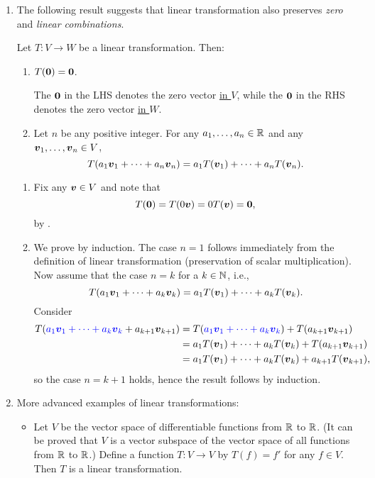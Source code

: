 \begin{enumerate}
\item The following result suggests that linear transformation also preserves
\emph{zero} and \emph{linear combinations}.
\begin{proposition}
\label{prp:lt-zero-to-zero-preserv-lincomb}
Let \(T:V\to W\) be a linear transformation. Then:
\begin{enumerate}
\item \(T(\vb*{0})=\vb*{0}\).
\begin{note}
The \(\vb*{0}\) in the LHS denotes the zero vector \underline{in \(V\)}, while
the \(\vb*{0}\) in the RHS denotes the zero vector \underline{in \(W\)}.
\end{note}
\item Let \(n\) be any positive integer. For any \(a_1,\dotsc,a_n\in\mathbb{R}\) and
any \(\vb*{v}_1,\dotsc,\vb*{v}_n\in V\),
\[
T(a_1\vb*{v}_1+\dotsb+a_n\vb*{v}_n)=a_1T(\vb*{v}_1)+\dotsb+a_nT(\vb*{v}_n).
\]
\end{enumerate}
\end{proposition}
\begin{pf}
\begin{enumerate}
\item Fix any \(\vb*{v}\in V\) and note that
\[
T(\vb*{0})=T(0\vb*{v})=0T(\vb*{v})=\vb*{0},
\]
by .

\item We prove by induction. The case \(n=1\) follows immediately from the
definition of linear transformation (preservation of scalar multiplication).
Now assume that the case \(n=k\) for a \(k\in\mathbb{N}\), i.e.,
\[
T(a_1\vb*{v}_1+\dotsb+a_k\vb*{v}_k)=a_1T(\vb*{v}_1)+\dotsb+a_kT(\vb*{v}_k).
\]
Consider
\begin{align*}
T({\color{blue}a_1\vb*{v}_1+\dotsb+a_k\vb*{v}_k}+a_{k+1}\vb*{v}_{k+1})
&=T({\color{blue}a_1\vb*{v}_1+\dotsb+a_k\vb*{v}_k})+T(a_{k+1}\vb*{v}_{k+1}) \\
&=a_1T(\vb*{v}_1)+\dotsb+a_kT(\vb*{v}_k)+T(a_{k+1}\vb*{v}_{k+1}) \\
&=a_1T(\vb*{v}_1)+\dotsb+a_kT(\vb*{v}_k)+a_{k+1}T(\vb*{v}_{k+1}),
\end{align*}
so the case \(n=k+1\) holds, hence the result follows by induction.
\end{enumerate}
\end{pf}

\item More advanced examples of linear transformations:
\begin{itemize}
\item Let \(V\) be the vector space of differentiable functions from \(\mathbb{R}\) to
\(\mathbb{R}\). (It can be proved that \(V\) is a vector subspace of the vector space
of all functions from \(\mathbb{R}\) to \(\mathbb{R}\).) Define a function \(T:V\to V\) by \(T(f)=f'\)
for any \(f\in V\). Then \(T\) is a linear transformation.


\end{itemize}
\end{enumerate}
